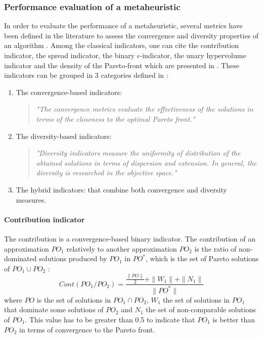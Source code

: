 \subsubsection{Performance evaluation of a metaheuristic}
In order to evaluate the performance of a metaheuristic, several metrics have been defined in the literature to assess the convergence and diversity properties of an algorithm \cite{talbi09}. Among the classical indicators, one can cite the contribution indicator, the spread indicator, the binary $\epsilon$-indicator, the unary hypervolume indicator and the density of the Pareto-front which are presented in \cite{talbi09, 1197687}. These indicators can be grouped in 3 categories defined in \cite{talbi09}:
\begin{enumerate}
	\item The convergence-based indicators:
	\begin{quote}
		\emph{"The convergence metrics evaluate the effectiveness of the solutions in terms of the closeness to the optimal Pareto front."}
	\end{quote}
	\item The diversity-based indicators:
	\begin{quote}
		\emph{"Diversity indicators measure the uniformity of distribution of the obtained solutions in terms of dispersion and extension. In general, the diversity is researched in the objective space."}
	\end{quote}
	\item The hybrid indicators: that combine both convergence and diversity measures.
\end{enumerate}


\paragraph{Contribution indicator}
The contribution is a convergence-based binary indicator. The contribution of an approximation $PO_1$ relatively to another approximation $PO_2$ is the ratio of non-dominated solutions produced by $PO_1$ in $PO^*$, which is the set of Pareto solutions of $PO_1 \cup PO_2$ \cite{talbi09}:
\begin{equation}
Cont(PO_1/PO_2) = \frac{\frac{\|PO\|}{2}+\|W_1\|+\|N_1\|}{\|PO^*\|}
\end{equation}
where $PO$ is the set of solutions in $PO_1 \cap PO_2$, $W_1$ the set of solutions in $PO_1$ that dominate some solutions of $PO_2$ and $N_1$ the set of non-comparable solutions of $PO_1$. This value has to be greater than 0.5 to indicate that $PO_1$ is better than $PO_2$ in terms of convergence to the Pareto front.

